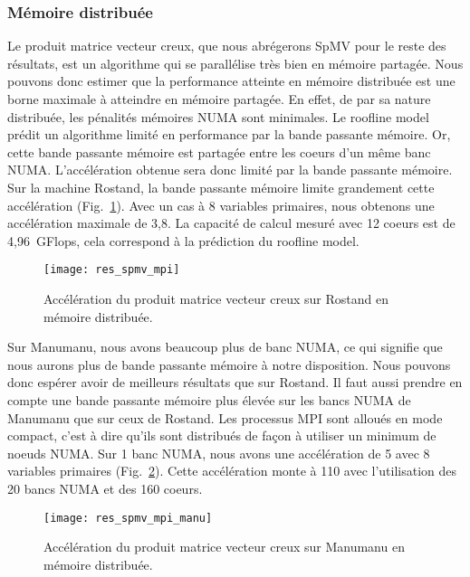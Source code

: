 \subsubsection{Mémoire distribuée}
Le produit matrice vecteur creux, que nous abrégerons SpMV pour le reste des résultats, est un algorithme qui se parallélise très bien en mémoire partagée.
%
Nous pouvons donc estimer que la performance atteinte en mémoire distribuée est une borne maximale à atteindre en mémoire partagée.
%
En effet, de par sa nature distribuée, les pénalités mémoires NUMA sont minimales.
%
Le roofline model prédit un algorithme limité en performance par la bande passante mémoire.
%
Or, cette bande passante mémoire est partagée entre les coeurs d'un même banc NUMA.
%
L'accélération obtenue sera donc limité par la bande passante mémoire.
%
Sur la machine Rostand, la bande passante mémoire limite grandement cette accélération (Fig.~\ref{fig:res_spmv_mpi_rostand}).
%
Avec un cas à 8 variables primaires, nous obtenons une accélération maximale de 3,8.
%
La capacité de calcul mesuré avec 12 coeurs est de 4,96~GFlops, cela correspond à la prédiction du roofline model.


\begin{figure}
  \centering
  \texttt{[image: res\_spmv\_mpi]}
  \caption{Accélération du produit matrice vecteur creux sur Rostand en mémoire distribuée.}
  \label{fig:res_spmv_mpi_rostand}
\end{figure}



Sur Manumanu, nous avons beaucoup plus de banc NUMA, ce qui signifie que nous aurons plus de bande passante mémoire à notre disposition.
%
Nous pouvons donc espérer avoir de meilleurs résultats que sur Rostand.
%
Il faut aussi prendre en compte une bande passante mémoire plus élevée sur les bancs NUMA de Manumanu que sur ceux de Rostand.
%
Les processus MPI sont alloués en mode compact, c'est à dire qu'ils sont distribués de façon à utiliser un minimum de noeuds NUMA.
%
Sur 1 banc NUMA, nous avons une accélération de 5 avec 8 variables primaires (Fig.~\ref{fig:res_spmv_mpi_manumanu}).
%
Cette accélération monte à 110 avec l'utilisation des 20 bancs NUMA et des 160 coeurs.


\begin{figure}
  \centering
  \texttt{[image: res\_spmv\_mpi\_manu]}
  \caption{Accélération du produit matrice vecteur creux sur Manumanu en mémoire distribuée.}
  \label{fig:res_spmv_mpi_manumanu}
\end{figure}

